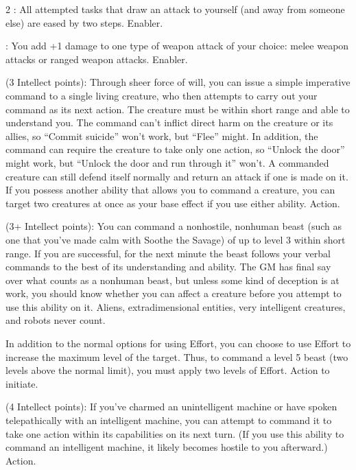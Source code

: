 \begin{multicols}{2}
: All attempted tasks that draw an attack to yourself (and away from someone else) are eased by two steps. Enabler. 

: You add +1 damage to one type of weapon attack of your choice: melee weapon attacks or ranged weapon attacks. Enabler. 

 (3 Intellect points): Through sheer force of will, you can issue a simple imperative command to a single living creature, who then attempts to carry out your command as its next action. The creature must be within short range and able to understand you. The command can’t inflict direct harm on the creature or its allies, so “Commit suicide” won’t work, but “Flee” might. In addition, the command can require the creature to take only one action, so “Unlock the door” might work, but “Unlock the door and run through it” won’t. A commanded creature can still defend itself normally and return an attack if one is made on it. If you possess another ability that allows you to command a creature, you can target two creatures at once as your base effect if you use either ability. Action. 

 (3+ Intellect points): You can command a nonhostile, nonhuman beast (such as one that you’ve made calm with Soothe the Savage) of up to level 3 within short range. If you are successful, for the next minute the beast follows your verbal commands to the best of its understanding and ability. The GM has final say over what counts as a nonhuman beast, but unless some kind of deception is at work, you should know whether you can affect a creature before you attempt to use this ability on it. Aliens, extradimensional entities, very intelligent creatures, and robots never count.

In addition to the normal options for using Effort, you can choose to use Effort to increase the maximum level of the target. Thus, to command a level 5 beast (two levels above the normal limit), you must apply two levels of Effort. Action to initiate.

 (4 Intellect points): If you’ve charmed an unintelligent machine or have spoken telepathically with an intelligent machine, you can attempt to command it to take one action within its capabilities on its next turn. (If you use this ability to command an intelligent machine, it likely becomes hostile to you afterward.) Action. 


\end{multicols}
